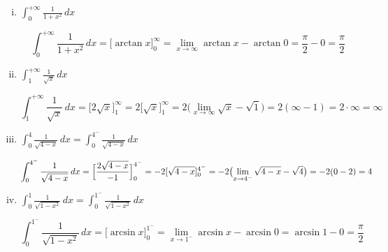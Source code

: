 




\pagestyle{askhseis}
\everymath{\displaystyle}



\begin{center}
\minibox{\large\bfseries \textcolor{Col1}{Γενικευμένα Ολοκληρώματα (λύσεις)}}
\end{center}

\vspace{\baselineskip}

\begin{enumerate}[i)]

  \item $ \boxed{\int _{0}^{+\infty} \frac{1}{1+x^2}  \,{dx}} $
    \begin{solution}
      \[
        \int _{0}^{+\infty} \frac{1}{1+x^2}  \,{dx} = \bigl[\arctan x\bigr]_{0}^{\infty} 
        = \lim_{x \to \infty} \arctan x - \arctan{0} = \frac{\pi}{2} - 0 = \frac{\pi}{2}
      \] 
    \end{solution}

  \item $ \boxed{\int _{1}^{+\infty} \frac{1}{\sqrt{x}}\,{dx}} $
    \begin{solution}
      \[
        \int _{1}^{+\infty} \frac{1}{\sqrt{x}}\,{dx} = 
        \bigl[2 \sqrt{x}\bigr]_{1}^{\infty} = 
        2 \bigl[\sqrt{x}\bigr]_{1}^{\infty} = 
        2 \bigl(\lim_{x \to \infty} \sqrt{x} - \sqrt{1}\bigr) = 2 (\infty - 1) = 2 \cdot
        \infty = \infty 
      \]
    \end{solution}

  \item $ \boxed{\int _{0}^{4} \frac{1}{\sqrt{4-x}} \,{dx}} = \int _{0}^{4^{-}}
    \frac{1}{\sqrt{4-x}} \,{dx} $
    \begin{solution}
      \[
        \int _{0}^{4^{-}} \frac{1}{\sqrt{4-x}} \,{dx} = \Bigl[
        \frac{2\sqrt{4-x}}{-1} \Bigr]_{0}^{4^{-}} = -2 [\sqrt{4-x}]_{0}^{4^-}
        = -2 \bigl(\lim_{x \to 4^{-}} \sqrt{4-x} - \sqrt{4}\bigr) = -2 (0 - 2) = 4
      \]
    \end{solution}

  \item $ \boxed{\int _{0}^{1} \frac{1}{\sqrt{1-x^2}} \,{dx}} = \int _{0}^{1^{-}} 
    \frac{1}{\sqrt{1-x^2}} \,{dx} $
    \begin{solution}
      \[
        \int _{0}^{1^{-}} \frac{1}{\sqrt{1-x^2}} \,{dx} = 
        \bigl[\arcsin x\bigr]_{0}^{1^-} = 
        \lim_{x \to 1^{-}} \arcsin{x} - \arcsin{0} = \arcsin{1} - 0 = \frac{\pi}{2}
      \]
    \end{solution}


\end{enumerate}
